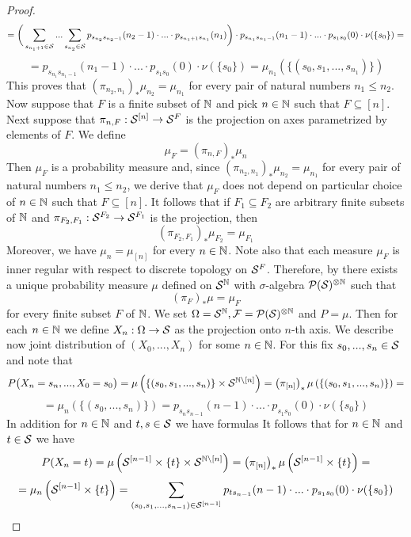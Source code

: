 \begin{proof}
$$= \bigg(\sum_{s_{n_1+1}\in {\mathcal S}}...\sum_{s_{n_2}\in {\mathcal S}}p_{s_{n_2}s_{n_2-1}}(n_2-1)\cdot ...\cdot p_{s_{n_1 + 1}s_{n_1}}(n_1)\bigg)\cdot p_{s_{n_1}s_{n_1-1}}(n_1-1) \cdot ...\cdot p_{s_{1}s_{0}}(0)\cdot \nu(\{s_0\}) =$$
$$=p_{s_{n_1}s_{n_1-1}}(n_1-1) \cdot ...\cdot p_{s_{1}s_{0}}(0)\cdot \nu(\{s_0\}) = \mu_{n_1}\left(\{(s_0,s_1,...,s_{n_1})\}\right)$$
This proves that $\left(\pi_{n_2,n_1}\right)_*\mu_{n_2} = \mu_{n_1}$ for every pair of natural numbers $n_1\leq n_2$. Now suppose that $F$ is a finite subset of ${\mathbb N}$ and pick $n\in {\mathbb N}$ such that $F\subseteq [n]$. Next suppose that $\pi_{n,F}:{\mathcal S}^{[n]}\rightarrow {\mathcal S}^F$ is the projection on axes parametrized by elements of $F$. We define
$$\mu_F = \left(\pi_{n,F}\right)_*\mu_n$$
Then $\mu_F$ is a probability measure and, since $\left(\pi_{n_2,n_1}\right)_*\mu_{n_2} = \mu_{n_1}$ for every pair of natural numbers $n_1\leq n_2$, we derive that $\mu_F$ does not depend on particular choice of $n\in {\mathbb N}$ such that $F\subseteq [n]$. It follows that if $F_1\subseteq F_2$ are arbitrary finite subsets of ${\mathbb N}$ and $\pi_{F_2,F_1}:{\mathcal S}^{F_2}\rightarrow {\mathcal S}^{F_1}$ is the projection, then 
$$\left(\pi_{F_2,F_1}\right)_*\mu_{F_2} = \mu_{F_1}$$
Moreover, we have $\mu_n = \mu_{[n]}$ for every $n\in {\mathbb N}$. Note also that each measure $\mu_F$ is inner regular with respect to discrete topology on ${\mathcal S}^F$. Therefore, by {\cite[Theorem 2.2]{Daniell_Kolmogorov_extension}} there exists a unique probability measure $\mu$ defined on ${\mathcal S}^{{\mathbb N}}$ with $\sigma$-algebra ${\mathcal P}({\mathcal S})^{\otimes {\mathbb N}}$ such that
$$\left(\pi_F\right)_*\mu = \mu_F$$
for every finite subset $F$ of ${\mathbb N}$. We set $\Omega = {\mathcal S}^{{\mathbb N}},{\mathcal F} = {\mathcal P}({\mathcal S})^{\otimes {\mathbb N}}$ and $P = \mu$. Then for each $n\in {\mathbb N}$ we define $X_n:\Omega\rightarrow {\mathcal S}$ as the projection onto $n$-th axis. We describe now joint distribution of $(X_0,...,X_n)$ for some $n\in {\mathbb N}$. For this fix $s_0,...,s_n \in {\mathcal S}$ and note that
$$P\big(X_n=s_n,...,X_0=s_0\big) = \mu\left(\{(s_0,s_1,...,s_n)\}\times {\mathcal S}^{{\mathbb N}\setminus [n]}\right) = \left(\pi_{[n]}\right)_*\mu\left(\{(s_0,s_1,...,s_n)\}\right) =$$
$$= \mu_n\left(\{(s_0,...,s_n)\}\right) = p_{s_ns_{n-1}}(n-1)\cdot ... \cdot p_{s_1s_0}(0) \cdot \nu(\{s_0\})$$
In addition for $n\in {\mathbb N}$ and $t,s\in {\mathcal S}$ we have formulas
It follows that for $n\in {\mathbb N}$ and $t\in {\mathcal S}$ we have
$$P(X_n = t) = \mu\left({\mathcal S}^{[n-1]}\times \{t\}\times {\mathcal S}^{{\mathbb N}\setminus [n]}\right) = \left(\pi_{[n]}\right)_*\mu\left({\mathcal S}^{[n-1]}\times \{t\}\right) =$$
$$= \mu_n\left({\mathcal S}^{[n-1]}\times \{t\}\right) = \sum_{(s_0,s_1,...,s_{n-1})\in {\mathcal S}^{[n-1]}}p_{ts_{n-1}}(n-1)\cdot ... \cdot p_{s_1s_0}(0) \cdot \nu(\{s_0\})$$

\end{proof}
